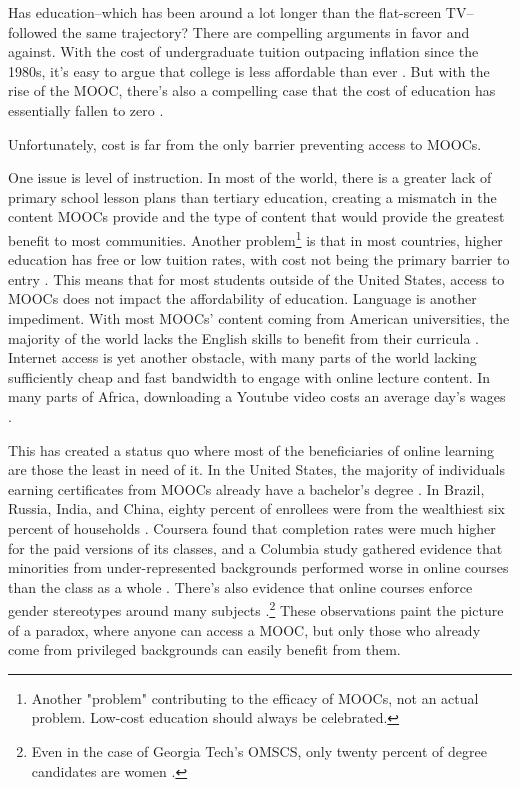 \documentclass[
	letterpaper, %
]{jdf}
\begin{document}
Has education–which has been around a lot longer than the flat-screen TV–followed the same trajectory? There are compelling arguments in favor and against. With the cost of undergraduate tuition outpacing inflation since the 1980s, it's easy to argue that college is less affordable than ever . But with the rise of the MOOC, there's also a compelling case that the cost of education has essentially fallen to zero .

Unfortunately, cost is far from the only barrier preventing access to MOOCs.

One issue is level of instruction. In most of the world, there is a greater lack of primary school lesson plans than tertiary education, creating a mismatch in the content MOOCs provide and the type of content that would provide the greatest benefit to most communities. Another problem\footnote{Another "problem" contributing to the efficacy of MOOCs, not an actual problem. Low-cost education should always be celebrated.} is that in most countries, higher education has free or low tuition rates, with cost not being the primary barrier to entry . This means that for most students outside of the United States, access to MOOCs does not impact the affordability of education. Language is another impediment. With most MOOCs' content coming from American universities, the majority of the world lacks the English skills to benefit from their curricula . Internet access is yet another obstacle, with  many parts of the world lacking sufficiently cheap and fast bandwidth to engage with online lecture content. In many parts of Africa, downloading a Youtube video costs an average day's wages .

This has created a status quo where most of the beneficiaries of online learning are those the least in need of it. In the United States, the majority of individuals earning certificates from MOOCs already have a bachelor's degree . In Brazil, Russia, India, and China, eighty percent of enrollees were from the wealthiest six percent of households . Coursera found that completion rates were much higher for the paid versions of its classes, and a Columbia study gathered evidence that minorities from under-represented backgrounds performed worse in online courses than the class as a whole . There's also evidence that online courses enforce gender stereotypes around many subjects .\footnote{Even in the case of Georgia Tech's OMSCS, only twenty percent of degree candidates are women .} These observations paint the picture of a paradox, where anyone can access a MOOC, but only those who already come from privileged backgrounds can easily benefit from them.
\end{document}
